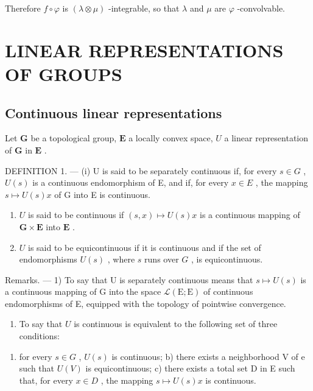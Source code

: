 Therefore \(f \circ \varphi\) is \((\lambda \otimes \mu)\) -integrable, so that \(\lambda\) and \(\mu\) are \(\varphi\) -convolvable.

\section{LINEAR REPRESENTATIONS OF GROUPS}

\subsection{Continuous linear representations}

Let \(\mathbf{G}\) be a topological group, \(\mathbf{E}\) a locally convex space, \(U\) a linear representation of \(\mathbf{G}\) in \(\mathbf{E}\) .

DEFINITION 1. --- (i) U is said to be separately continuous if, for every \(s \in G\) , \(U(s)\) is a continuous endomorphism of E, and if, for every \(x \in E\) , the mapping \(s \mapsto U(s)x\) of G into E is continuous.

\begin{enumerate}
\def\labelenumi{(\roman{enumi})}
\setcounter{enumi}{1}
\item
  \(U\) is said to be continuous if \((s,x)\mapsto U(s)x\) is a continuous mapping of \(\mathbf{G}\times \mathbf{E}\) into \(\mathbf{E}\) .
\item
  \(U\) is said to be equicontinuous if it is continuous and if the set of endomorphisms \(U(s)\) , where \(s\) runs over \(G\) , is equicontinuous.
\end{enumerate}

Remarks. --- 1) To say that U is separately continuous means that \(s \mapsto U(s)\) is a continuous mapping of G into the space \(\mathcal{L}(\mathrm{E};\mathrm{E})\) of continuous endomorphisms of E, equipped with the topology of pointwise convergence.

\begin{enumerate}
\def\labelenumi{\arabic{enumi})}
\setcounter{enumi}{1}
\tightlist
\item
  To say that \(U\) is continuous is equivalent to the following set of three conditions:
\end{enumerate}

\begin{enumerate}
\def\labelenumi{\alph{enumi})}
\tightlist
\item
  for every \(s \in G\) , \(U(s)\) is continuous; b) there exists a neighborhood V of e such that \(U(V)\) is equicontinuous; c) there exists a total set D in E such that, for every \(x \in D\) , the mapping \(s \mapsto U(s)x\) is continuous.
\end{enumerate}

